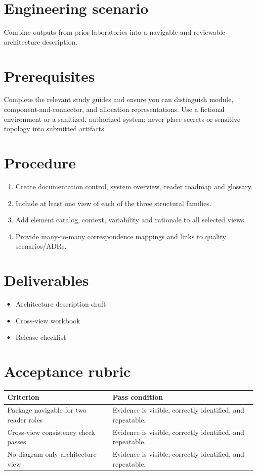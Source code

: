 \documentclass[10pt,letterpaper]{article}
\begin{document}
\DocProvenance
\section{Engineering scenario}
Combine outputs from prior laboratories into a navigable and reviewable architecture description.

\section{Prerequisites}
Complete the relevant study guides and ensure you can distinguish module, component-and-connector, and allocation representations. Use a fictional environment or a sanitized, authorized system; never place secrets or sensitive topology into submitted artifacts.

\section{Procedure}
\begin{enumerate}
\item Create documentation control, system overview, reader roadmap and glossary.
\item Include at least one view of each of the three structural families.
\item Add element catalog, context, variability and rationale to all selected views.
\item Provide many-to-many correspondence mappings and links to quality scenarios/ADRs.
\end{enumerate}
\section{Deliverables}
\begin{itemize}
\item Architecture description draft
\item Cross-view workbook
\item Release checklist
\end{itemize}
\section{Acceptance rubric}
\small
\begin{tabularx}{\linewidth}{@{}YY@{}}
\toprule
\textbf{Criterion} & \textbf{Pass condition} \\
\midrule
Package navigable for two reader roles & Evidence is visible, correctly identified, and repeatable. \\
Cross-view consistency check passes & Evidence is visible, correctly identified, and repeatable. \\
No diagram-only architecture view & Evidence is visible, correctly identified, and repeatable. \\
\bottomrule
\end{tabularx}
\normalsize
\end{document}

